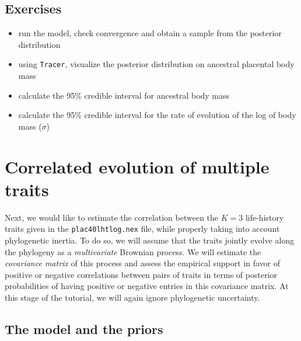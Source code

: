 \documentclass[usletter]{article}
\newcommand{\cmd}[1]{\texttt{#1}}
\begin{document}
\subsection*{Exercises}

\begin{itemize}
\item
run the model, check convergence and obtain a sample from the posterior distribution
\item
using \cmd{Tracer}, visualize the posterior distribution on ancestral placental body mass
\item
calculate the 95\% credible interval for ancestral body mass
\item
calculate the 95\% credible interval for the rate of evolution of the log of body mass ($\sigma$)
\end{itemize}



\section{Correlated evolution of multiple traits}
\label{multivariate}

Next, we would like to estimate the correlation between the $K=3$ life-history traits given in the \cmd{plac40lhtlog.nex} file, while properly taking into account phylogenetic inertia. 
To do so, we will assume that the traits jointly evolve along the phylogeny as a \emph{multivariate} Brownian process.
We will estimate the \emph{covariance matrix} of this process and assess the empirical support in favor of positive or negative correlations between pairs of traits in terms of posterior probabilities of having positive or negative entries in this covariance matrix.
At this stage of the tutorial, we will again ignore phylogenetic uncertainty.

\subsection*{The model and the priors}
\end{document}
